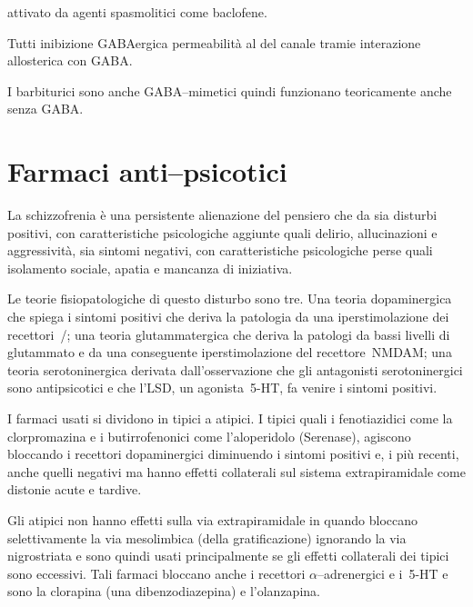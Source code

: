  attivato da agenti spasmolitici come baclofene.

Tutti \upa inibizione GABAergica \upa permeabilità al  del canale  tramie interazione allosterica con GABA.


I barbiturici sono anche GABA--mimetici quindi funzionano teoricamente anche senza GABA.

\section{Farmaci anti--psicotici}

La schizzofrenia è una persistente alienazione del pensiero che da sia disturbi positivi, con caratteristiche psicologiche aggiunte quali delirio, allucinazioni e aggressività, sia sintomi negativi, con caratteristiche psicologiche perse quali isolamento sociale, apatia e mancanza di iniziativa.

Le teorie fisiopatologiche di questo disturbo sono tre. Una teoria dopaminergica che spiega i sintomi positivi che deriva la patologia da una iperstimolazione dei recettori~/; una teoria glutammatergica che deriva la patologi da bassi livelli di glutammato e da una conseguente iperstimolazione del recettore~NMDAM; una teoria serotoninergica derivata dall'osservazione che gli antagonisti serotoninergici sono antipsicotici e che l'LSD, un agonista~5-HT, fa venire i sintomi positivi.

I farmaci usati si dividono in tipici a atipici. I tipici quali i fenotiazidici come la clorpromazina e i butirrofenonici come l'aloperidolo (Serenase), agiscono bloccando i recettori dopaminergici diminuendo i sintomi positivi e, i più recenti, anche quelli negativi ma hanno effetti collaterali sul sistema extrapiramidale come distonie acute e tardive. 

Gli atipici non hanno effetti sulla via extrapiramidale in quando bloccano selettivamente la via mesolimbica (della gratificazione) ignorando la via nigrostriata e sono quindi usati principalmente se gli effetti collaterali dei tipici sono eccessivi. Tali farmaci bloccano anche i recettori $\alpha$--adrenergici e i~5-HT e sono la clorapina (una dibenzodiazepina) e l'olanzapina.

